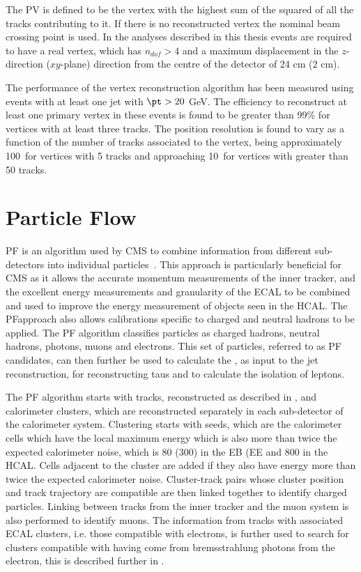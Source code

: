 The \ac{PV} is defined to be the vertex with the highest sum of the squared \pt of all the tracks contributing to it. If there is no reconstructed vertex the nominal beam crossing point is used. In the analyses described in this thesis events are required to have a real vertex, which has $n_{dof}>4$ and a maximum displacement in the $z$-direction ($xy$-plane) direction from the centre of the detector of 24 cm (2 cm).

The performance of the vertex reconstruction algorithm has been measured using events with at least one jet with $\pt>20$ GeV. The efficiency to reconstruct at least one primary vertex in these events is found to be greater than 99\% for vertices with at least three tracks. The position resolution is found to vary as a function of the number of tracks associated to the vertex, being approximately 100\micron\, for vertices with 5 tracks and approaching 10\micron\, for vertices with greater than 50 tracks.

\section{Particle Flow}
\label{sec:pf}
\ac{PF} is an algorithm used by CMS to combine information from different sub-detectors into individual particles~\cite{CMS-PAS-PFT-09-001,CMS-PAS-PFT-10-001,CMS-PAS-PFT-10-002}. This approach is particularly beneficial for CMS as it allows the accurate momentum measurements of the inner tracker, and the excellent energy measurements and granularity of the \ac{ECAL} to be combined and used to improve the energy measurement of objects seen in the \ac{HCAL}. The \ac{PF}approach also allows calibrations specific to charged and neutral hadrons to be applied. The \ac{PF} algorithm classifies particles as charged hadrons, neutral hadrons, photons, muons and electrons. This set of particles, referred to as \ac{PF} candidates, can then further be used to calculate the \MET, as input to the jet reconstruction, for reconstructing taus and to calculate the isolation of leptons.

The \ac{PF} algorithm starts with tracks, reconstructed as described in , and calorimeter clusters, which are reconstructed separately in each sub-detector of the calorimeter system. Clustering starts with seeds, which are the calorimeter cells which have the local maximum energy which is also more than twice the expected calorimeter noise, which is 80 (300) \MeV in the \ac{EB} (\ac{EE} and 800 \MeV in the \ac{HCAL}. Cells adjacent to the cluster are added if they also have energy more than twice the expected calorimeter noise. Cluster-track pairs whose cluster position and track trajectory are compatible are then linked together to identify charged particles. Linking between tracks from the inner tracker and the muon system is also performed to identify muons. The information from tracks with associated \ac{ECAL} clusters, i.e. those compatible with electrons, is further used to search for clusters compatible with having come from bremsstrahlung photons from the electron, this is described further in .

